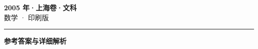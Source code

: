 \documentclass[zihao=5, a4paper]{ctexart}
\begin{document}
\begin{center}
  {\Large\bfseries 2005 年·上海卷·文科}\\[4pt]
  {\large 数学 · 印刷版}
\end{center}
\medskip
{}

\par\bigskip\hrule\bigskip
{}
\begin{center}{\large\bfseries 参考答案与详细解析}\end{center}
\smallskip

\end{document}
